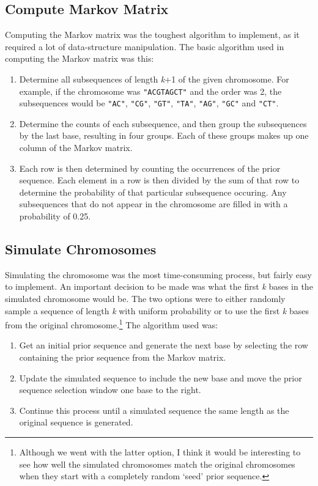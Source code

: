 \documentclass[12pt]{article}
\begin{document}
\subsection{Compute Markov Matrix}
Computing the Markov matrix was the toughest algorithm to implement, as it required a lot of data-structure manipulation. The basic algorithm used in computing the Markov matrix was this:
\begin{enumerate}
\item Determine all subsequences of length \textit{k}+1 of the given chromosome. For example, if the chromosome was \texttt{"ACGTAGCT"} and the order was 2, the subsequences would be \texttt{"AC"}, \texttt{"CG"}, \texttt{"GT"}, \texttt{"TA"}, \texttt{"AG"}, \texttt{"GC"} and \texttt{"CT"}.
\item Determine the counts of each subsequence, and then group the subsequences by the last base, resulting in four groups. Each of these groups makes up one column of the Markov matrix.
\item Each row is then determined by counting the occurrences of the prior sequence. Each element in a row is then divided by the sum of that row to determine the probability of that particular subsequence occuring. Any subsequences that do not appear in the chromosome are filled in with a probability of 0.25.
\end{enumerate}
\subsection{Simulate Chromosomes}
Simulating the chromosome was the most time-consuming process, but fairly easy to implement. An important decision to be made was what the first \textit{k} bases in the simulated chromosome would be. The two options were to either randomly sample a sequence of length \textit{k} with uniform probability or to use the first \textit{k} bases from the original chromosome.\footnote{Although we went with the latter option, I think it would be interesting to see how well the simulated chromosomes match the original chromosomes when they start with a completely random `seed' prior sequence.} The algorithm used was:
\begin{enumerate}
\item Get an initial prior sequence and generate the next base by selecting the row containing the prior sequence from the Markov matrix.
\item Update the simulated sequence to include the new base and move the prior sequence selection window one base to the right.
\item Continue this process until a simulated sequence the same length as the original sequence is generated.
\end{enumerate}
\end{document}
